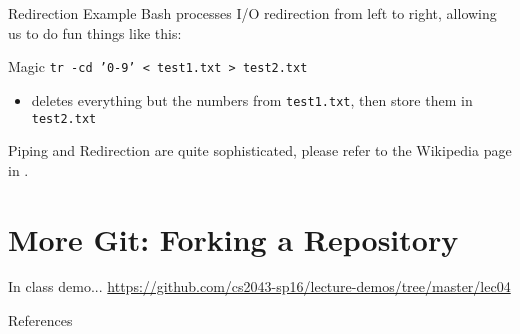\begin{frame}[fragile]{Redirection Example}
  Bash processes I/O redirection from left to right, allowing us to do fun things like this:

  \begin{block}{Magic}
    \texttt{tr -cd '0-9' < test1.txt > test2.txt}
    \begin{itemize}
      \item deletes everything but the numbers from \texttt{test1.txt}, then store them in \texttt{test2.txt}
    \end{itemize}
  \end{block}

  Piping and Redirection are quite sophisticated, please refer to the Wikipedia page in \cite{wiki}.
\end{frame}
%

%
\section{More Git: Forking a Repository}
\label{sec:more_git_forking_a_repository}

\begin{frame}[fragile]{In class demo...}
  \href{https://github.com/cs2043-sp16/lecture-demos/tree/master/lec04}{https://github.com/cs2043-sp16/lecture-demos/tree/master/lec04}
\end{frame}

%

\begin{frame}[allowframebreaks]{References}
  
  
\end{frame}


